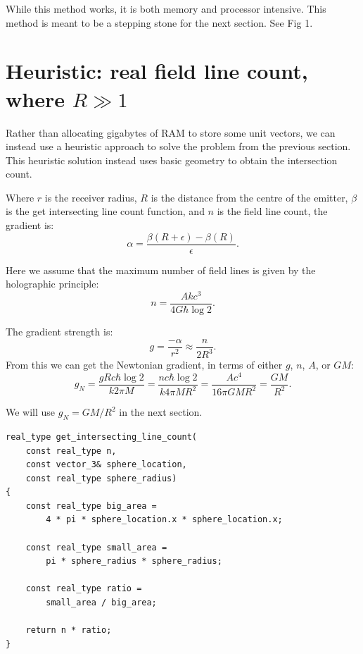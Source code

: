 \documentclass[12pt]{article}
\begin{document}
While this method works, it is both memory and processor intensive.
This method is meant to be a stepping stone for the next section.
See Fig 1.






\section{Heuristic: real field line count, where $R \gg 1$}

Rather than allocating gigabytes of RAM to store some unit vectors, we can instead use a heuristic approach to solve the problem from the previous section.
This heuristic solution instead uses basic geometry to obtain the intersection count.

Where $r$ is the receiver radius, $R$ is the distance from the centre of the emitter, $\beta$ is the get intersecting line count function, and $n$ is the field line count, the gradient is:
\begin{equation}
\alpha = \frac{\beta(R + \epsilon) - \beta(R)}{\epsilon}.
\end{equation}

Here we assume that the maximum number of field lines is given by the holographic principle:
\begin{equation}
n = \frac{A k c^3}{ 4 G \hbar \log 2}.
\end{equation}

The gradient strength is:
\begin{equation}
g = \frac{-\alpha}{r^2} \approx \frac{n}{2 R^3}.
\end{equation}
From this we can get the Newtonian gradient, in terms of either $g$, $n$, $A$, or $G M$:
\begin{equation}
\label{g_N_equation}
g_N = \frac{g R c \hbar \log 2}{k 2 \pi M} = \frac{n c \hbar \log 2}{k 4 \pi M R^2} = \frac{A c^4}{16 \pi G M R^2} = \frac{G M}{R^2}.
\end{equation}

We will use $g_N = {G M}/{R^2}$ in the next section.

\begin{lstlisting}
real_type get_intersecting_line_count(
	const real_type n,
	const vector_3& sphere_location,
	const real_type sphere_radius)
{
	const real_type big_area = 
		4 * pi * sphere_location.x * sphere_location.x;

	const real_type small_area = 
		pi * sphere_radius * sphere_radius;
	
	const real_type ratio = 
		small_area / big_area;
	
	return n * ratio;
}
\end{lstlisting}
\end{document}
